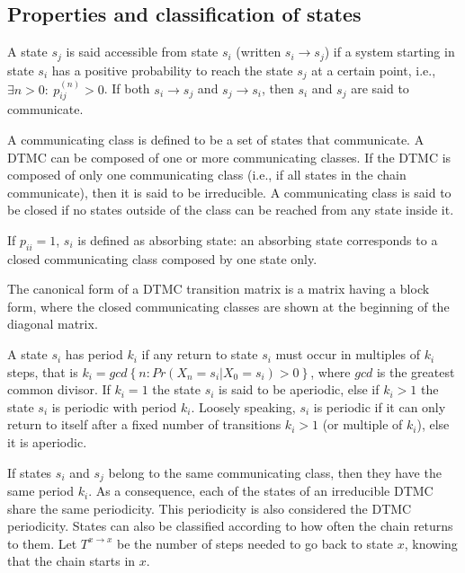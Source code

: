 \documentclass[
  nojss]{jss}
\begin{document}
\subsection{Properties and classification of states}\label{sec:properties}

A state \(s_{j}\) is said accessible from state \(s_{i}\) (written \(s_{i}\rightarrow s_{j}\)) if a system starting in state \(s_{i}\) has a positive probability to reach the state \(s_{j}\) at a certain point, i.e., \(\exists n>0:\: p_{ij}^{(n)}>0\). If both \(s_{i}\rightarrow s_{j}\) and \(s_{j}\rightarrow s_{i}\), then
\(s_{i}\) and \(s_{j}\) are said to communicate.

A communicating class is defined to be a set of states that communicate. A DTMC can be composed of one or more communicating classes. If the DTMC is composed of only one communicating class (i.e., if all states in the chain communicate), then it is said to be irreducible. A communicating class is said to be closed if no states outside of the class can be reached from any state inside it.

If \(p_{ii}=1\), \(s_{i}\) is defined as absorbing state: an absorbing state corresponds to a closed communicating class composed by one state only.

The canonical form of a DTMC transition matrix is a matrix having a block form, where the closed communicating classes are shown at the beginning of the diagonal matrix.

A state \(s_{i}\) has period \(k_{i}\) if any return to state \(s_{i}\) must occur in multiples of \(k_{i}\) steps, that is \(k_{i}=gcd\left\{ n:Pr\left(X_{n}=s_{i}\left|X_{0}=s_{i}\right.\right)>0\right\}\), where \(gcd\) is the greatest common divisor. If \(k_{i}=1\) the state \(s_{i}\) is said to be aperiodic, else if \(k_{i}>1\) the state \(s_{i}\) is periodic with period \(k_{i}\). Loosely speaking, \(s_{i}\) is periodic if it can only return to itself after a fixed number of transitions \(k_{i}>1\) (or multiple of \(k_{i}\)), else it is aperiodic.

If states \(s_{i}\) and \(s_{j}\) belong to the same communicating class, then they have the same period \(k_{i}\). As a consequence, each of the states of an irreducible DTMC share the same periodicity. This periodicity is also considered the DTMC periodicity. States can also be classified according to how often the chain returns to them. Let \(T^{x\rightarrow x}\) be the number of steps needed to go back to state \(x\), knowing that the chain starts in \(x\).
\end{document}
